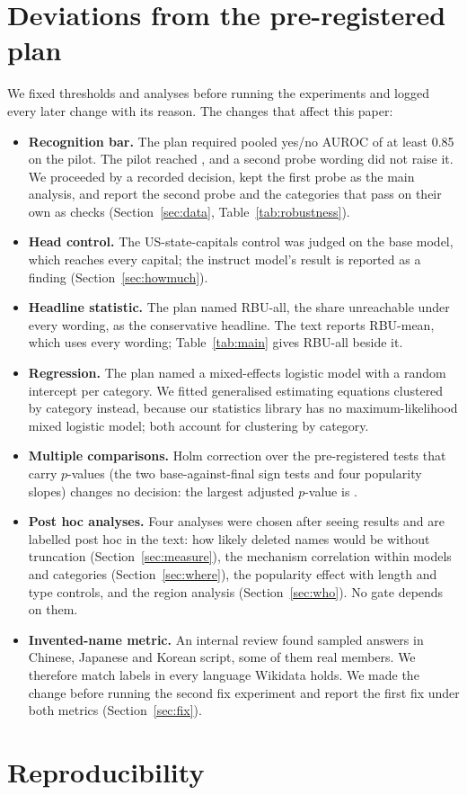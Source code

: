 \documentclass[11pt]{article}
\begin{document}
\section{Deviations from the pre-registered plan}\label{app:deviations}
We fixed thresholds and analyses before running the experiments and logged every later change with its reason. The changes that affect this paper:
\begin{itemize}
\item \textbf{Recognition bar.} The plan required pooled yes/no AUROC of at least 0.85 on the pilot. The pilot reached \gzQwenInstAuroc{}, and a second probe wording did not raise it. We proceeded by a recorded decision, kept the first probe as the main analysis, and report the second probe and the categories that pass on their own as checks (Section~\ref{sec:data}, Table~\ref{tab:robustness}).
\item \textbf{Head control.} The US-state-capitals control was judged on the base model, which reaches every capital; the instruct model's result is reported as a finding (Section~\ref{sec:howmuch}).
\item \textbf{Headline statistic.} The plan named RBU-all, the share unreachable under every wording, as the conservative headline. The text reports RBU-mean, which uses every wording; Table~\ref{tab:main} gives RBU-all beside it.
\item \textbf{Regression.} The plan named a mixed-effects logistic model with a random intercept per category. We fitted generalised estimating equations clustered by category instead, because our statistics library has no maximum-likelihood mixed logistic model; both account for clustering by category.
\item \textbf{Multiple comparisons.} Holm correction over the \goHolmTests{} pre-registered tests that carry $p$-values (the two base-against-final sign tests and four popularity slopes) changes no decision: the largest adjusted $p$-value is \goHolmMaxP{}.
\item \textbf{Post hoc analyses.} Four analyses were chosen after seeing results and are labelled post hoc in the text: how likely deleted names would be without truncation (Section~\ref{sec:measure}), the mechanism correlation within models and categories (Section~\ref{sec:where}), the popularity effect with length and type controls, and the region analysis (Section~\ref{sec:who}). No gate depends on them.
\item \textbf{Invented-name metric.} An internal review found sampled answers in Chinese, Japanese and Korean script, some of them real members. We therefore match labels in every language Wikidata holds. We made the change before running the second fix experiment and report the first fix under both metrics (Section~\ref{sec:fix}).
\end{itemize}

\section{Reproducibility}\label{app:repro}

\end{document}
